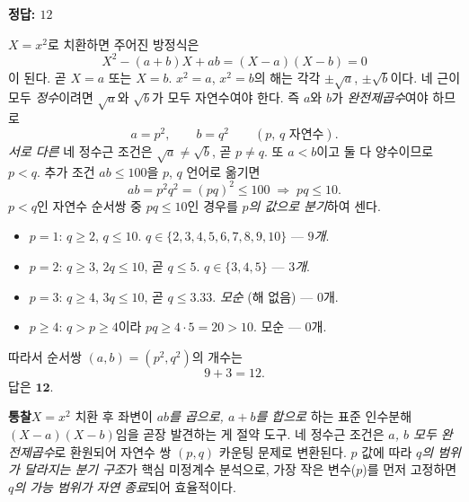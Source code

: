 \documentclass[10pt]{article}
\newcommand{\solnote}[1]{\par\smallskip\noindent
  \begin{tcolorbox}[enhanced, breakable, colback=vB-light, colframe=vB-light,
    boxrule=0pt, arc=3pt, left=10pt, right=10pt, top=4pt, bottom=4pt,
    fontupper=\sffamily\footnotesize\color{vB-ink}]
    \textbf{\color{vB-deep}통찰}\quad #1
  \end{tcolorbox}}
\begin{document}
\begin{answerbox}\sffamily\bfseries 정답: $12$\end{answerbox}
 $X = x^2$로 치환하면 주어진 방정식은
\[ X^2 - (a + b)X + ab = (X - a)(X - b) = 0 \]
이 된다. 곧 $X = a$ 또는 $X = b$.
 $x^2 = a$, $x^2 = b$의 해는 각각 $\pm \sqrt{a}$, $\pm \sqrt{b}$이다.
 네 근이 모두 \emph{정수}이려면 $\sqrt{a}$와 $\sqrt{b}$가 모두 자연수여야 한다. 즉 $a$와 $b$가 \emph{완전제곱수}여야 하므로
\[ a = p^2, \qquad b = q^2 \qquad (p,\, q \text{ 자연수}). \]
 \emph{서로 다른} 네 정수근 조건은 $\sqrt{a} \ne \sqrt{b}$, 곧 $p \ne q$. 또 $a < b$이고 둘 다 양수이므로 $p < q$.
 추가 조건 $ab \le 100$을 $p$, $q$ 언어로 옮기면
\[ ab = p^2 q^2 = (pq)^2 \le 100 \;\Longrightarrow\; pq \le 10. \]
 $p < q$인 자연수 순서쌍 중 $pq \le 10$인 경우를 \emph{$p$의 값으로 분기}하여 센다.
\begin{itemize}\setlength{\itemsep}{0pt}
\item \textbf{$p = 1$}: $q \ge 2$, $q \le 10$. $q \in \{2, 3, 4, 5, 6, 7, 8, 9, 10\}$ — \emph{$9$개}.
\item \textbf{$p = 2$}: $q \ge 3$, $2q \le 10$, 곧 $q \le 5$. $q \in \{3, 4, 5\}$ — \emph{$3$개}.
\item \textbf{$p = 3$}: $q \ge 4$, $3q \le 10$, 곧 $q \le 3.33$. \emph{모순} (해 없음) — $0$개.
\item \textbf{$p \ge 4$}: $q > p \ge 4$이라 $pq \ge 4 \cdot 5 = 20 > 10$. 모순 — $0$개.
\end{itemize}
 따라서 순서쌍 $(a, b) = (p^2, q^2)$의 개수는
\[ 9 + 3 = 12. \]
답은 $\textbf{12}$.
\solnote{$X = x^2$ 치환 후 좌변이 \emph{$ab$를 곱으로, $a+b$를 합으로} 하는 표준 인수분해 $(X-a)(X-b)$임을 곧장 발견하는 게 절약 도구. 네 정수근 조건은 \emph{$a$, $b$ 모두 완전제곱수}로 환원되어 자연수 쌍 $(p, q)$ 카운팅 문제로 변환된다. $p$ 값에 따라 \emph{$q$의 범위가 달라지는 분기 구조}가 핵심 미정계수 분석으로, 가장 작은 변수($p$)를 먼저 고정하면 \emph{$q$의 가능 범위가 자연 종료}되어 효율적이다.}
\end{document}
